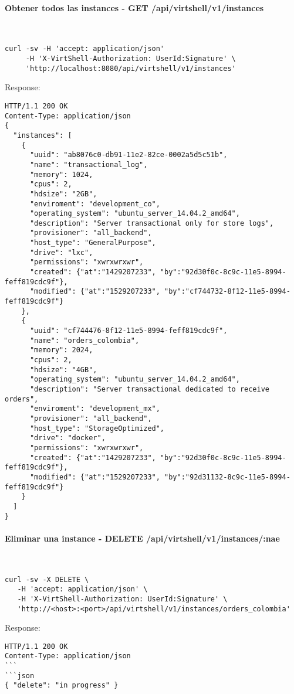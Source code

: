 \paragraph{Obtener todos las instances - GET /api/virtshell/v1/instances} ~\\

\begin{lstlisting}[style=json]
curl -sv -H 'accept: application/json' 
     -H 'X-VirtShell-Authorization: UserId:Signature' \ 
     'http://localhost:8080/api/virtshell/v1/instances'
\end{lstlisting}

Response:

\begin{lstlisting}[style=json]
HTTP/1.1 200 OK
Content-Type: application/json
{
  "instances": [
    {
      "uuid": "ab8076c0-db91-11e2-82ce-0002a5d5c51b",
      "name": "transactional_log",
      "memory": 1024,
      "cpus": 2,
      "hdsize": "2GB",
      "enviroment": "development_co",
      "operating_system": "ubuntu_server_14.04.2_amd64",
      "description": "Server transactional only for store logs", 
      "provisioner": "all_backend",
      "host_type": "GeneralPurpose",
      "drive": "lxc",
      "permissions": "xwrxwrxwr",
      "created": {"at":"1429207233", "by":"92d30f0c-8c9c-11e5-8994-feff819cdc9f"},
      "modified": {"at":"1529207233", "by":"cf744732-8f12-11e5-8994-feff819cdc9f"}
    },
    { 
      "uuid": "cf744476-8f12-11e5-8994-feff819cdc9f",
      "name": "orders_colombia",
      "memory": 2024,
      "cpus": 2,
      "hdsize": "4GB",
      "operating_system": "ubuntu_server_14.04.2_amd64",
      "description": "Server transactional dedicated to receive orders", 
      "enviroment": "development_mx",
      "provisioner": "all_backend",
      "host_type": "StorageOptimized",
      "drive": "docker",
      "permissions": "xwrxwrxwr",
      "created": {"at":"1429207233", "by":"92d30f0c-8c9c-11e5-8994-feff819cdc9f"},
      "modified": {"at":"1529207233", "by":"92d31132-8c9c-11e5-8994-feff819cdc9f"}
    }    
  ]
} 
\end{lstlisting}

\paragraph{Eliminar una instance - DELETE /api/virtshell/v1/instances/:nae} ~\\

\begin{lstlisting}[style=json]
curl -sv -X DELETE \
   -H 'accept: application/json' \
   -H 'X-VirtShell-Authorization: UserId:Signature' \
   'http://<host>:<port>/api/virtshell/v1/instances/orders_colombia'
\end{lstlisting}

Response:

\begin{lstlisting}[style=json]
HTTP/1.1 200 OK
Content-Type: application/json
```
```json
{ "delete": "in progress" }
\end{lstlisting}